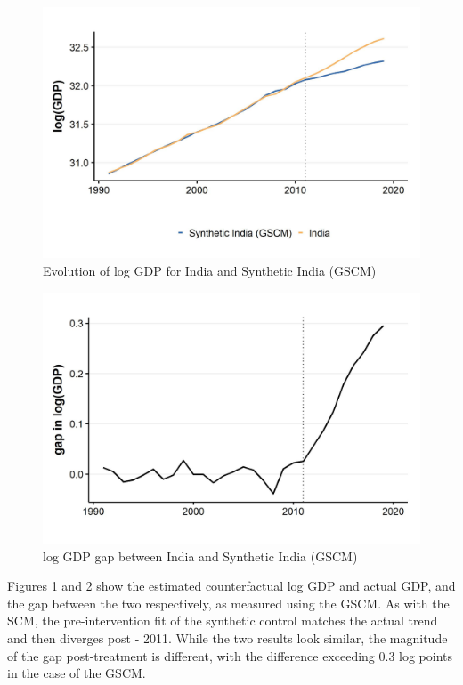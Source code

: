 \documentclass[12pt,nobind, a4paper]{reedthesis}
\begin{document}
 \newpage
 \begin{figure}

 {\centering \includegraphics[width=1\linewidth]{figure/indiagsynth} 

 }

 \caption{Evolution of log GDP for India and Synthetic India (GSCM)}\label{fig:indgsyn}
 \end{figure}
 \begin{figure}

 {\centering \includegraphics[width=1\linewidth]{figure/indiagsynthgap} 

 }

 \caption{log GDP gap between India and Synthetic India (GSCM)}\label{fig:indgsyngap}
 \end{figure}
 Figures \ref{fig:indgsyn} and \ref{fig:indgsyngap} show the estimated counterfactual log GDP and actual GDP, and the gap between the two respectively, as measured using the GSCM. As with the SCM, the pre-intervention fit of the synthetic control matches the actual trend and then diverges post - 2011. While the two results look similar, the magnitude of the gap post-treatment is different, with the difference exceeding 0.3 log points in the case of the GSCM.
\end{document}

